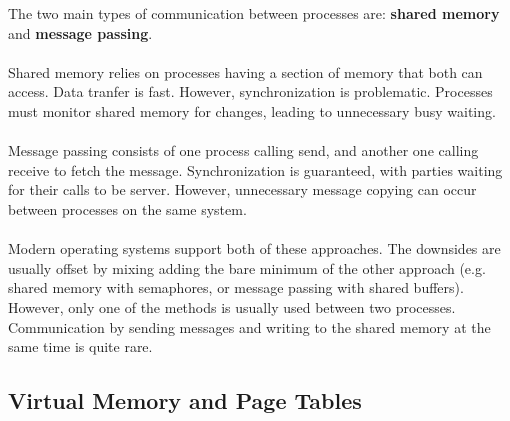 \documentclass[conference]{IEEEtran}
\begin{document}
The two main types of communication between processes are: \textbf{shared memory} and \textbf{message passing}.
\\
\\
Shared memory relies on processes having a section of memory that both can access. Data tranfer is fast. However, synchronization is problematic. Processes must monitor shared memory for changes, leading to unnecessary busy waiting.
\\
\\
Message passing consists of one process calling send, and another one calling receive to fetch the message. Synchronization is guaranteed, with parties waiting for their calls to be server. However, unnecessary message copying can occur between processes on the same system.
\\
\\
Modern operating systems support both of these approaches. The downsides are usually offset by mixing adding the bare minimum of the other approach (e.g. shared memory with semaphores, or message passing with shared buffers). However, only one of the methods is usually used between two processes. Communication by sending messages and writing to the shared memory at the same time is quite rare.

\subsection{Virtual Memory and Page Tables} \label{sec:vm}
\end{document}
